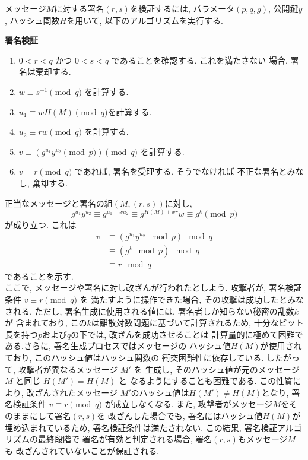 \vspace{1em}
メッセージ$M$に対する署名$(r, s)$を検証するには, パラメータ$(p,q,g)$, 
公開鍵$y$, ハッシュ関数$H$を用いて, 以下のアルゴリズムを実行する.
\vspace{1em}
\let\ltxlist\list
\begin{breakitembox}[l]{\textbf{署名検証}}
  　
  \begin{enumerate}[parsep=7pt]
    \item $0<r<q$ かつ $0<s<q$ であることを確認する. これを満たさない
    場合, 署名は棄却する.
    \item $w\equiv s^{-1}\pmod q$ を計算する.
    \item $u_1\equiv wH(M)\pmod q$を計算する.
    \item $u_2\equiv rw\pmod q$ を計算する.
    \item $v\equiv (g^{u_1}y^{u_2}\pmod p)\pmod q$ を計算する.
    \item $v=r\pmod  q$ であれば, 署名を受理する. そうでなければ
    不正な署名とみなし, 棄却する.
  \end{enumerate}
\end{breakitembox}
\vspace{1em}
\indent 正当なメッセージと署名の組$(M, (r, s))$に対し, 
\begin{equation}
  g^{u_1}y^{u_2}\equiv g^{u_1+xu_2} \equiv g^{H(M)+xr}w\equiv g^{k}\pmod p
\end{equation}
が成り立つ. これは 
\begin{align*}
  v &\equiv (g^{u_1}y^{u_2} \mod p) \mod q \\
    &\equiv (g^k \mod p) \mod q \\
    &\equiv r \mod q
\end{align*}
であることを示す.\\
\indent ここで, メッセージや署名に対し改ざんが行われたとしよう. 
攻撃者が, 署名検証条件 $v \equiv r \pmod{q}$ を
満たすように操作できた場合, その攻撃は成功したとみなされる. ただし, 
署名生成に使用される値には, 署名者しか知らない秘密の乱数$k$が
含まれており, この$k$は離散対数問題に基づいて計算されるため, 
十分なビット長を持つ$p$および$q$の下では, 改ざんを成功させることは
計算量的に極めて困難である.さらに, 署名生成プロセスではメッセージの
ハッシュ値$H(M)$が使用されており, このハッシュ値はハッシュ関数の
衝突困難性に依存している. したがって, 攻撃者が異なるメッセージ $M'$ を
生成し, そのハッシュ値が元のメッセージ $M$ と同じ $H(M') = H(M)$ と
なるようにすることも困難である. この性質により, 改ざんされたメッセージ
$M'$のハッシュ値は$H(M')\neq H(M)$となり, 
署名検証条件 $v \equiv r \pmod{q}$ が成立しなくなる.
また, 攻撃者がメッセージ$M$をそのままにして署名$(r, s)$を
改ざんした場合でも, 署名にはハッシュ値$H(M)$が埋め込まれているため, 
署名検証条件は満たされない. この結果, 署名検証アルゴリズムの最終段階で
署名が有効と判定される場合, 署名$(r, s)$もメッセージ$M$も
改ざんされていないことが保証される.


